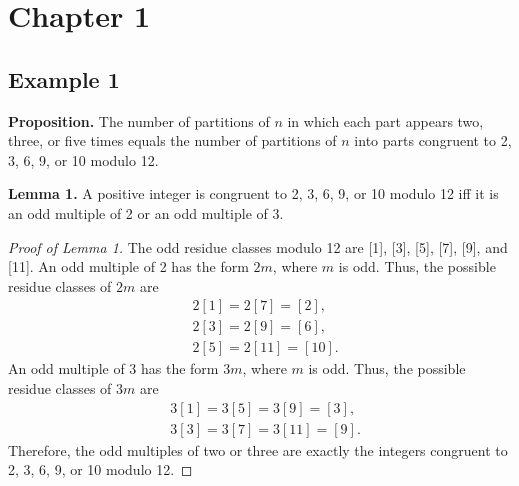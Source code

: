 

\maketitle

\tableofcontents
\clearpage{}


\section{Chapter 1}\label{sec:chapter-1}

\subsection*{Example 1}\label{subsec:example-1}

\noindent
\textbf{Proposition.}
The number of partitions of $n$ in which each part appears two, three, or five times
equals the number of partitions of $n$ into parts congruent to 2, 3, 6, 9, or 10 modulo 12.

\noindent
\textbf{Lemma 1.}
A positive integer is congruent to 2, 3, 6, 9, or 10 modulo 12 iff it is an odd
multiple of 2 or an odd multiple of 3.

\noindent
\begin{proof}[Proof of Lemma 1]
    The odd residue classes modulo 12 are [1], [3], [5], [7], [9], and [11].
    An odd multiple of 2 has the form $2m$, where $m$ is odd.
    Thus, the possible residue classes of $2m$ are
    \begin{align*}
        &2[1] = 2[7] = [2], \\
        &2[3] = 2[9] = [6], \\
        &2[5]  = 2[11] = [10].
    \end{align*}
    An odd multiple of 3 has the form $3m$, where $m$ is odd.
    Thus, the possible residue classes of $3m$ are
    \begin{align*}
        &3[1] = 3[5] = 3[9] = [3], \\
        &3[3] = 3[7] = 3[11] = [9].
    \end{align*}
    Therefore, the odd multiples of two or three are exactly the integers congruent to 2, 3, 6, 9, or 10 modulo 12.
\end{proof}

